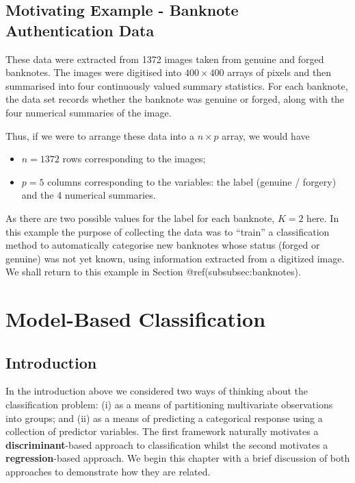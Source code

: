 \documentclass[
]{article}
\providecommand{\tightlist}{%
  \setlength{\itemsep}{0pt}\setlength{\parskip}{0pt}}
\begin{document}
\hypertarget{motivating-example---banknote-authentication-data}{%
\subsection{Motivating Example - Banknote Authentication
Data}\label{motivating-example---banknote-authentication-data}}

These data were extracted from 1372 images taken from genuine and forged
banknotes. The images were digitised into \(400 \times 400\) arrays of
pixels and then summarised into four continuously valued summary
statistics. For each banknote, the data set records whether the banknote
was genuine or forged, along with the four numerical summaries of the
image.

Thus, if we were to arrange these data into a \(n \times p\) array, we
would have

\begin{itemize}
\tightlist
\item
  \(n=1372\) rows corresponding to the images;
\item
  \(p=5\) columns corresponding to the variables: the label (genuine /
  forgery) and the 4 numerical summaries.
\end{itemize}

As there are two possible values for the label for each banknote,
\(K=2\) here. In this example the purpose of collecting the data was to
``train'' a classification method to automatically categorise new
banknotes whose status (forged or genuine) was not yet known, using
information extracted from a digitized image. We shall return to this
example in Section @ref(subsubsec:banknotes).

\hypertarget{model-based-classification}{%
\section{Model-Based Classification}\label{model-based-classification}}

\hypertarget{introduction-1}{%
\subsection{Introduction}\label{introduction-1}}

In the introduction above we considered two ways of thinking about the
classification problem: (i) as a means of partitioning multivariate
observations into groups; and (ii) as a means of predicting a
categorical response using a collection of predictor variables. The
first framework naturally motivates a \textbf{discriminant}-based
approach to classification whilst the second motivates a
\textbf{regression}-based approach. We begin this chapter with a brief
discussion of both approaches to demonstrate how they are related.
\end{document}
